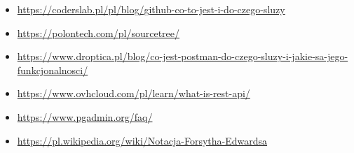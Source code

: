 \documentclass[12pt,a4paper]{article}
\begin{document}
\begin{itemize}
    \item \href{https://coderslab.pl/pl/blog/github-co-to-jest-i-do-czego-sluzy}{https://coderslab.pl/pl/blog/github-co-to-jest-i-do-czego-sluzy}
    \item \href{https://polontech.com/pl/sourcetree/}{https://polontech.com/pl/sourcetree/}
    \item \href{https://www.droptica.pl/blog/co-jest-postman-do-czego-sluzy-i-jakie-sa-jego-funkcjonalnosci/}{https://www.droptica.pl/blog/co-jest-postman-do-czego-sluzy-i-jakie-sa-jego-funkcjonalnosci/}
    \item \href{https://www.ovhcloud.com/pl/learn/what-is-rest-api/}{https://www.ovhcloud.com/pl/learn/what-is-rest-api/}
    \item \href{https://www.pgadmin.org/faq/}{https://www.pgadmin.org/faq/}
    \item \href{https://pl.wikipedia.org/wiki/Notacja-Forsytha-Edwardsa}{https://pl.wikipedia.org/wiki/Notacja-Forsytha-Edwardsa}
\end{itemize}
\end{document}
